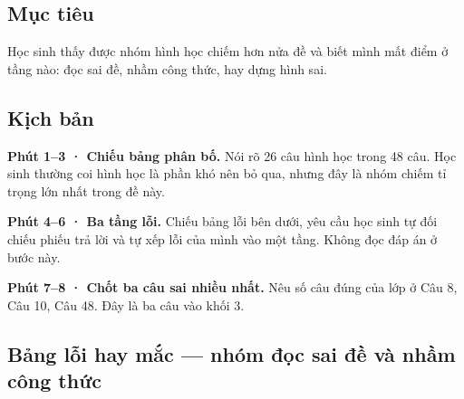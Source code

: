 \documentclass[11pt, a4paper]{article}
\begin{document}
\subsection{Mục tiêu}

Học sinh thấy được nhóm hình học chiếm hơn nửa đề và biết mình mất điểm ở tầng nào: đọc sai đề, nhầm công thức, hay dựng hình sai.

\subsection{Kịch bản}

\textbf{Phút 1–3 · Chiếu bảng phân bố.} Nói rõ 26 câu hình học trong 48 câu. Học sinh thường coi hình học là phần khó nên bỏ qua, nhưng đây là nhóm chiếm tỉ trọng lớn nhất trong đề này.

\textbf{Phút 4–6 · Ba tầng lỗi.} Chiếu bảng lỗi bên dưới, yêu cầu học sinh tự đối chiếu phiếu trả lời và tự xếp lỗi của mình vào một tầng. Không đọc đáp án ở bước này.

\textbf{Phút 7–8 · Chốt ba câu sai nhiều nhất.} Nêu số câu đúng của lớp ở Câu 8, Câu 10, Câu 48. Đây là ba câu vào khối 3.

\subsection{Bảng lỗi hay mắc — nhóm đọc sai đề và nhầm công thức}

\end{document}
